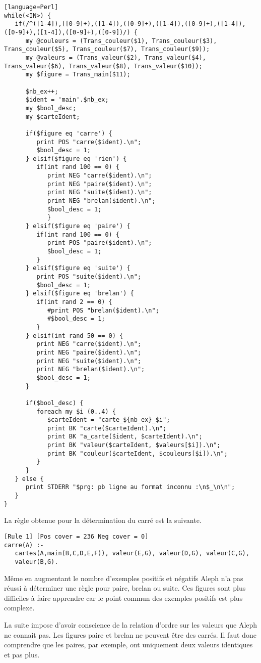 \documentclass[a4paper,12pt]{article}
\begin{document}
\begin{lstlisting}[frame=single][language=Perl]
while(<IN>) {
   if(/^([1-4]),([0-9]+),([1-4]),([0-9]+),([1-4]),([0-9]+),([1-4]),([0-9]+),([1-4]),([0-9]+),([0-9])/) {
      my @couleurs = (Trans_couleur($1), Trans_couleur($3), Trans_couleur($5), Trans_couleur($7), Trans_couleur($9));
      my @valeurs = (Trans_valeur($2), Trans_valeur($4), Trans_valeur($6), Trans_valeur($8), Trans_valeur($10));
      my $figure = Trans_main($11);

      $nb_ex++;
      $ident = 'main'.$nb_ex;
      my $bool_desc;
      my $carteIdent;

      if($figure eq 'carre') {
         print POS "carre($ident).\n";
         $bool_desc = 1;
      } elsif($figure eq 'rien') {
         if(int rand 100 == 0) {
            print NEG "carre($ident).\n";
            print NEG "paire($ident).\n";
            print NEG "suite($ident).\n";
            print NEG "brelan($ident).\n";
            $bool_desc = 1;
            }
      } elsif($figure eq 'paire') {
         if(int rand 100 == 0) {
            print POS "paire($ident).\n";
            $bool_desc = 1;
         }
      } elsif($figure eq 'suite') {
         print POS "suite($ident).\n";
         $bool_desc = 1;
      } elsif($figure eq 'brelan') {
         if(int rand 2 == 0) {
            #print POS "brelan($ident).\n";
            #$bool_desc = 1;
         }
      } elsif(int rand 50 == 0) {
         print NEG "carre($ident).\n";
         print NEG "paire($ident).\n";
         print NEG "suite($ident).\n";
         print NEG "brelan($ident).\n";
         $bool_desc = 1;
      }

      if($bool_desc) {
         foreach my $i (0..4) {
            $carteIdent = "carte_${nb_ex}_$i";
            print BK "carte($carteIdent).\n";
            print BK "a_carte($ident, $carteIdent).\n";
            print BK "valeur($carteIdent, $valeurs[$i]).\n";
            print BK "couleur($carteIdent, $couleurs[$i]).\n";
         }
      }
   } else {
      print STDERR "$prg: pb ligne au format inconnu :\n$_\n\n";
   }
}
\end{lstlisting}

La règle obtenue pour la détermination du carré est la suivante.

\begin{lstlisting}[frame=single]
[Rule 1] [Pos cover = 236 Neg cover = 0]
carre(A) :-
   cartes(A,main(B,C,D,E,F)), valeur(E,G), valeur(D,G), valeur(C,G), 
   valeur(B,G).
\end{lstlisting}

Même en augmentant le nombre d'exemples positifs et négatifs Aleph n'a pas réussi à déterminer une règle pour paire, brelan ou suite.
Ces figures sont plus difficiles à faire apprendre car le point commun des exemples positifs est plus complexe.

La suite impose d'avoir conscience de la relation d'ordre sur les valeurs que Aleph ne connait pas.
Les figures paire et brelan ne peuvent être des carrés.
Il faut donc comprendre que les paires, par exemple, ont uniquement deux valeurs identiques et pas plus.
\end{document}
